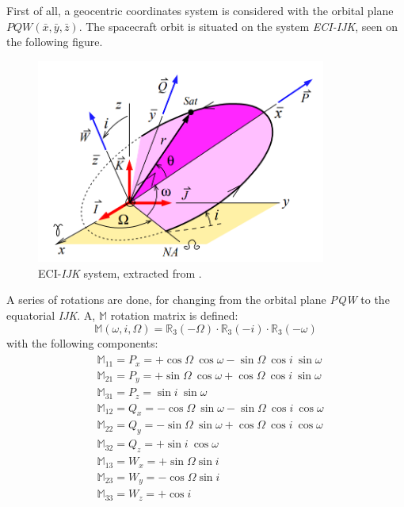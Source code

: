 First of all, a geocentric coordinates system is considered with the orbital plane \textit{$PQW(\bar{x}, \bar{y}, \bar{z})$}. The spacecraft orbit is situated on the system \textit{ECI-IJK}, seen on the following figure.
\begin{figure}[H]
	\centering
	\includegraphics[clip, trim=0cm 0cm 0cm 0cm, width=0.85\textwidth]{./images/satelliteAxis}
	\caption{ECI-\textit{IJK} system, extracted from \cite{PCA}.} %
	\label{} %
\end{figure}

A series of rotations are done, for changing from the orbital plane \textit{PQW} to the equatorial \textit{IJK}. A, $\mathbb{M}$ rotation matrix is defined:
\begin{equation*}
	\mathbb{M}(\omega,i,\Omega) = \mathbb{R}_3(-\Omega)\cdot\mathbb{R}_3(-i)\cdot\mathbb{R}_3(-\omega)
\end{equation*}
with the following components:
\begin{align}
	\begin{split}
		&\mathbb{M}_{11} = P_x = +\cos\Omega \ \cos \omega -\sin\Omega \ \cos i \ \sin\omega\\
		&\mathbb{M}_{21} = P_y = +\sin\Omega \ \cos \omega +\cos\Omega \ \cos i \ \sin\omega\\
		&\mathbb{M}_{31} = P_z = \sin i \ \sin\omega\\
		&\mathbb{M}_{12} = Q_x = -\cos\Omega \ \sin \omega -\sin\Omega \ \cos i \ \cos\omega\\
		&\mathbb{M}_{22} = Q_y = -\sin\Omega \ \sin \omega +\cos\Omega \ \cos i \ \cos\omega\\
		&\mathbb{M}_{32} = Q_z = +\sin i \ \cos\omega\\
		&\mathbb{M}_{13} = W_x = +\sin\Omega \sin i\\
		&\mathbb{M}_{23} = W_y = -\cos\Omega \sin i\\
		&\mathbb{M}_{33} = W_z = +\cos i\\
	\end{split}	
\end{align}


